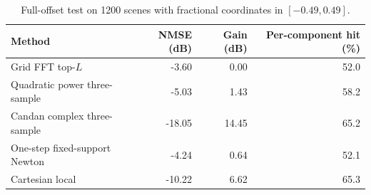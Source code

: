\begin{table}[!ht]
\centering
\caption{Full-offset test on 1200 scenes with fractional coordinates in $[-0.49,0.49]$.}
\label{tab:supp_full_offset}
\footnotesize
\begin{tabular}{lrrr}
\toprule
Method & NMSE (dB) & Gain (dB) & Per-component hit (\%) \\
\midrule
Grid FFT top-$L$ & -3.60 & 0.00 & 52.0 \\
Quadratic power three-sample & -5.03 & 1.43 & 58.2 \\
Candan complex three-sample & -18.05 & 14.45 & 65.2 \\
One-step fixed-support Newton & -4.24 & 0.64 & 52.1 \\
Cartesian local & -10.22 & 6.62 & 65.3 \\
\bottomrule
\end{tabular}
\end{table}
